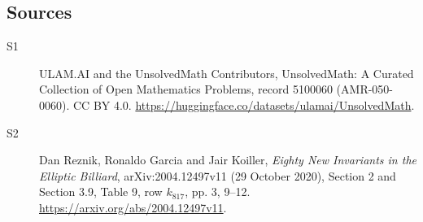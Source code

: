 \documentclass[11pt]{article}
\begin{document}
\subsection{Sources}
\begin{description}
\item[\hypertarget{source:5100060:1}{S1}] ULAM.AI and the UnsolvedMath Contributors, UnsolvedMath: A Curated Collection of Open Mathematics Problems, record 5100060 (AMR-050-0060). CC BY 4.0. \url{https://huggingface.co/datasets/ulamai/UnsolvedMath}.
\item[\hypertarget{source:5100060:2}{S2}] Dan Reznik, Ronaldo Garcia and Jair Koiller, \emph{Eighty New Invariants in the Elliptic Billiard}, arXiv:2004.12497v11 (29 October 2020), Section 2 and Section 3.9, Table 9, row $k_{817}$, pp. 3, 9--12. \url{https://arxiv.org/abs/2004.12497v11}.
\end{description}
\label{end:5100060}
\end{document}
